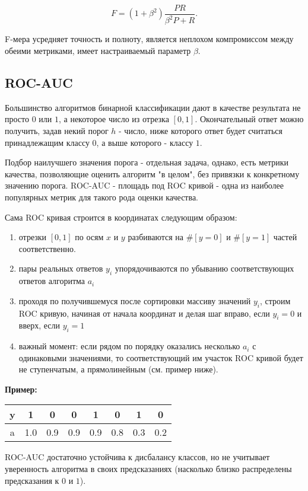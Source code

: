 $$
F = (1+\beta^2)\frac{PR}{\beta^2P + R}.
$$

F-мера усредняет точность и полноту, является неплохом компромиссом между обеими метриками, имеет настраиваемый параметр $\beta$.

\subsection{ROC-AUC}

Большинство алгоритмов бинарной классификации дают в качестве результата не просто $0$ или $1$, а некоторое число из отрезка $[0, 1]$. Окончательный ответ можно получить, задав некий порог $h$ - число, ниже которого ответ будет считаться принадлежащим классу $0$, а выше которого - классу $1$. 

Подбор наилучшего значения порога - отдельная задача, однако, есть метрики качества, позволяющие оценить алгоритм "в целом", без привязки к конкретному значению порога. ROC-AUC - площадь под ROC кривой - одна из наиболее популярных метрик для такого рода оценки качества. 

Сама ROC кривая строится в координатах следующим образом:
\begin{enumerate}
    \item отрезки $[0, 1]$ по осям $x$ и $y$ разбиваются на $\#[y=0]$ и $\#[y=1]$ частей соответственно.
    \item пары реальных ответов $y_i$ упорядочиваются по убыванию соответствующих ответов алгоритма $a_i$
    \item проходя по получившемуся после сортировки массиву значений $y_i$, строим ROC кривую, начиная от начала координат и делая шаг вправо, если $y_i=0$ и вверх, если $y_i=1$
    \item важный момент: если рядом по порядку оказались несколько $a_i$ с одинаковыми значениями, то соответствующий им участок ROC кривой будет не ступенчатым, а прямолинейным (см. пример ниже).
\end{enumerate}


\textbf{Пример:}
\begin{center}
\begin{tabular}{ |c|c|c|c|c|c|c|c| } 
 \hline
 y & 1 & 0 & 0 & 1 & 0 & 1 & 0 \\ 
 \hline
 a & 1.0 & 0.9 & 0.9 & 0.9 & 0.8 & 0.3 & 0.2 \\ 
 \hline
\end{tabular}
\end{center}

ROC-AUC достаточно устойчива к дисбалансу классов, но не учитывает уверенность алгоритма в своих предсказаниях (насколько близко распределены предсказания к $0$ и $1$).


